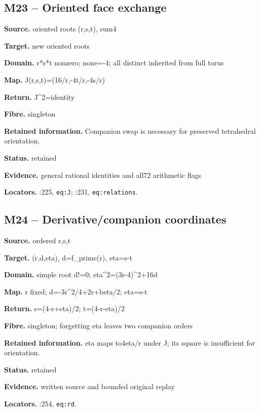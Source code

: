 \subsection*{M23 -- Oriented face exchange}
\noindent\textbf{Source.} oriented roots (r,s,t), sum4\par
\noindent\textbf{Target.} new oriented roots\par
\noindent\textbf{Domain.} r*s*t nonzero; none=-4; all distinct inherited from full torus\par
\noindent\textbf{Map.} J(r,s,t)=(16/r,-4t/r,-4s/r)\par
\noindent\textbf{Return.} J\textasciicircum{}2=identity\par
\noindent\textbf{Fibre.} singleton\par
\noindent\textbf{Retained information.} Companion swap is necessary for preserved tetrahedral orientation.\par
\noindent\textbf{Status.} retained\par
\noindent\textbf{Evidence.} general rational identities and all72 arithmetic flags\par
\noindent\textbf{Locators.} :225, \texttt{eq:J}; :231, \texttt{eq:relations}.
\subsection*{M24 -- Derivative/companion coordinates}
\noindent\textbf{Source.} ordered r,s,t\par
\noindent\textbf{Target.} (r,d,eta), d=f\_prime(r), eta=s-t\par
\noindent\textbf{Domain.} simple root d!=0; eta\textasciicircum{}2=(3r-4)\textasciicircum{}2+16d\par
\noindent\textbf{Map.} r fixed; d=-3r\textasciicircum{}2/4+2r+beta/2; eta=s-t\par
\noindent\textbf{Return.} s=(4-r+eta)/2; t=(4-r-eta)/2\par
\noindent\textbf{Fibre.} singleton; forgetting eta leaves two companion orders\par
\noindent\textbf{Retained information.} eta maps to4eta/r under J; its square is insufficient for orientation.\par
\noindent\textbf{Status.} retained\par
\noindent\textbf{Evidence.} written source and bounded original replay\par
\noindent\textbf{Locators.} :254, \texttt{eq:rd}.
